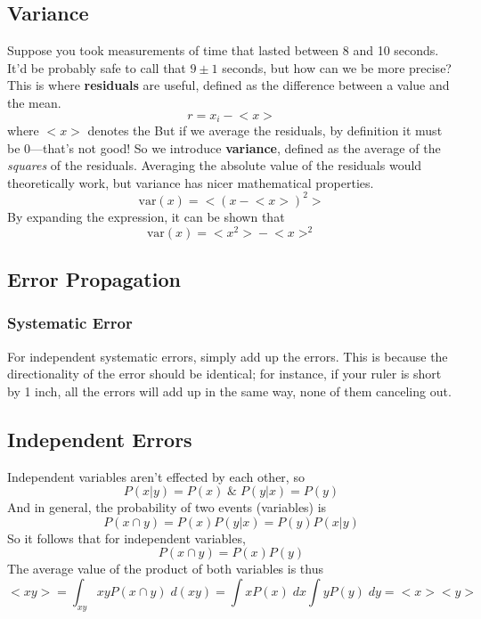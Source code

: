 \documentclass[../PhysicsFormulae.tex]{subfiles}
\begin{document}
\subsection{Variance}
Suppose you took measurements of time that lasted between 8 and 10 seconds. It'd be probably safe to call that $9 \pm 1$ seconds, but how can we be more precise? This is where \textbf{residuals} are useful, defined as the difference between a value and the mean. 
\[ r = x_i - \mathrm{<}x\mathrm{>} \]
where $\mathrm{<}x\mathrm{>}$ denotes the But if we average the residuals, by definition it must be 0---that's not good! So we introduce \textbf{variance}, defined as the average of the \textit{squares} of the residuals. Averaging the absolute value of the residuals would theoretically work, but variance has nicer mathematical properties. 
\[ \mathrm{var}(x) = \mathrm{<}(x - \mathrm{<}x\mathrm{>})^2\mathrm{>} \]
By expanding the expression, it can be shown that 
\[ \mathrm{var}(x) = \mathrm{<}x^2\mathrm{>} - \mathrm{<}x\mathrm{>}^2 \]

\subsection{Error Propagation}
\subsubsection{Systematic Error}
For independent systematic errors, simply add up the errors. This is because the directionality of the error should be identical; for instance, if your ruler is short by 1 inch, all the errors will add up in the same way, none of them canceling out. 

\subsection{Independent Errors}
Independent variables aren't effected by each other, so
\[ P(x|y) = P(x) \; \& \; P(y|x) = P(y) \]
And in general, the probability of two events (variables) is 
\[ P(x \cap y) = P(x) P(y|x) = P(y) P(x|y) \]
So it follows that for independent variables, 
\[ P(x \cap y) = P(x)P(y) \]
The average value of the product of both variables is thus
\[ \mathrm{<}xy\mathrm{>} = \int_{xy} xyP(x \cap y) \; d(xy) = \int xP(x) \; dx \int yP(y) \; dy = \mathrm{<}x\mathrm{>} \mathrm{<}y\mathrm{>} \]
\end{document}
